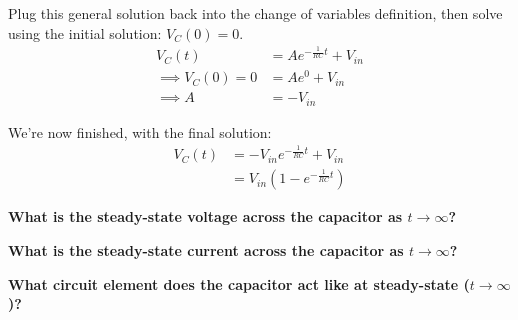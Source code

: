 \begin{enumerate}
{    Plug this general solution back into the change of variables definition, then solve using the initial solution: $V_C(0) = 0$.
    \begin{align*}
        V_C(t) &= Ae^{-\frac{1}{RC} t} + V_{in} \\
        \implies V_C(0) = 0 &= Ae^0 + V_{in} \\
        \implies A &= -V_{in}
    \end{align*}
    
    We're now finished, with the final solution:
    \begin{align*}
        V_C(t) &= -V_{in}e^{-\frac{1}{RC} t} + V_{in} \\
               &= V_{in} (1 - e^{-\frac{1}{RC} t})
    \end{align*}
}

\qitem \textbf{What is the steady-state voltage across the capacitor as $t \rightarrow \infty$?}

\ws{
\vspace{40px}
}


\qitem \textbf{What is the steady-state current across the capacitor as $t \rightarrow \infty$?}

\ws{
\vspace{40px}
}


\qitem \textbf{What circuit element does the capacitor act like at steady-state ($t \rightarrow \infty$)?}


\end{enumerate}
